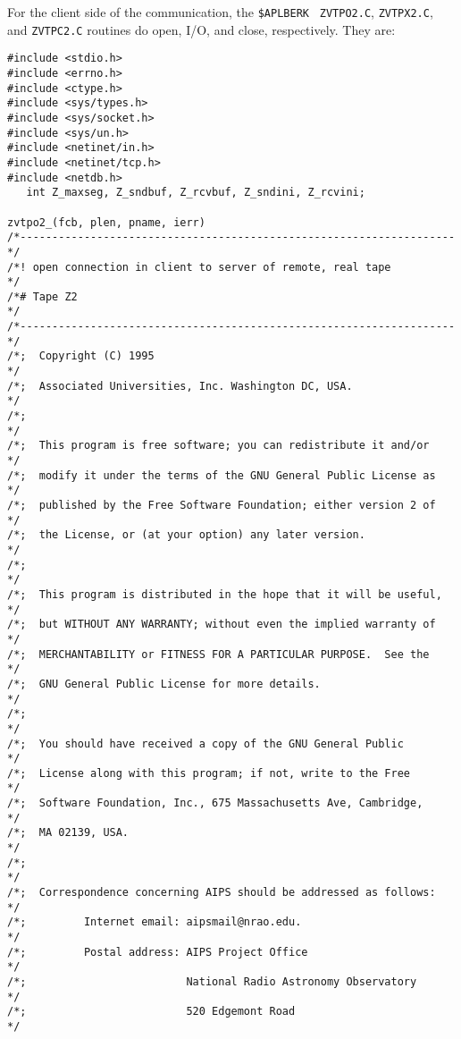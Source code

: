 For the client side of the communication, the {\tt \$APLBERK} {\tt
ZVTPO2.C}, {\tt ZVTPX2.C}, and {\tt ZVTPC2.C} routines do open, I/O,
and close, respectively.  They are:

\begin{center}
\begin{verbatim}
#include <stdio.h>
#include <errno.h>
#include <ctype.h>
#include <sys/types.h>
#include <sys/socket.h>
#include <sys/un.h>
#include <netinet/in.h>
#include <netinet/tcp.h>
#include <netdb.h>
   int Z_maxseg, Z_sndbuf, Z_rcvbuf, Z_sndini, Z_rcvini;

zvtpo2_(fcb, plen, pname, ierr)
/*--------------------------------------------------------------------*/
/*! open connection in client to server of remote, real tape          */
/*# Tape Z2                                                           */
/*--------------------------------------------------------------------*/
/*;  Copyright (C) 1995                                               */
/*;  Associated Universities, Inc. Washington DC, USA.                */
/*;                                                                   */
/*;  This program is free software; you can redistribute it and/or    */
/*;  modify it under the terms of the GNU General Public License as   */
/*;  published by the Free Software Foundation; either version 2 of   */
/*;  the License, or (at your option) any later version.              */
/*;                                                                   */
/*;  This program is distributed in the hope that it will be useful,  */
/*;  but WITHOUT ANY WARRANTY; without even the implied warranty of   */
/*;  MERCHANTABILITY or FITNESS FOR A PARTICULAR PURPOSE.  See the    */
/*;  GNU General Public License for more details.                     */
/*;                                                                   */
/*;  You should have received a copy of the GNU General Public        */
/*;  License along with this program; if not, write to the Free       */
/*;  Software Foundation, Inc., 675 Massachusetts Ave, Cambridge,     */
/*;  MA 02139, USA.                                                   */
/*;                                                                   */
/*;  Correspondence concerning AIPS should be addressed as follows:   */
/*;         Internet email: aipsmail@nrao.edu.                        */
/*;         Postal address: AIPS Project Office                       */
/*;                         National Radio Astronomy Observatory      */
/*;                         520 Edgemont Road                         */

\end{verbatim}
\end{center}
